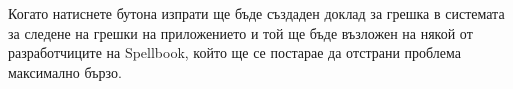 Когато натиснете бутона изпрати ще бъде създаден доклад за грешка в
системата за следене на грешки на приложението и той ще бъде възложен
на някой от разработчиците на Spellbook, който ще се постарае да
отстрани проблема максимално бързо.
 
